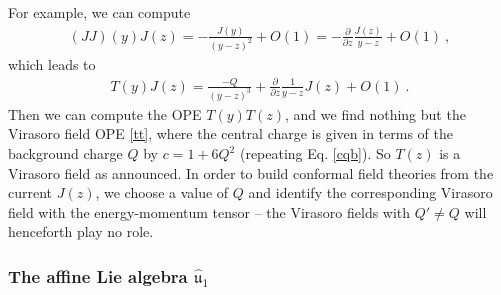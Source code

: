 \documentclass[12pt, a4paper, notitlepage, twoside]{report}
\numberwithin{equation}{section}
\theoremstyle{break}
\begin{document}
For example, we can compute 
\begin{align}
 (JJ)(y)J(z) = -\frac{J(y)}{(y-z)^2} +O(1) =  -{\frac{\partial}{\partial z}}\frac{J(z)}{y-z} + O(1)\ ,
\end{align}
which leads to 
\begin{align}
 \boxed{T(y)J(z) = \frac{-Q}{(y-z)^3} +{\frac{\partial}{\partial z}}\frac{1}{y-z}J(z) + O(1)}\ .
\label{tqj}
\end{align}
Then we can compute the OPE $T(y)T(z)$, and we find nothing but the Virasoro field OPE \eqref{tt}, where the central charge is given in terms of the background charge $Q$ by $c = 1+6 Q^2$ (repeating Eq. \eqref{cqb}). 
So $T(z)$ is a Virasoro field as announced. 
In order to build conformal field theories from the current $J(z)$, we choose a value of $Q$ and identify the corresponding Virasoro field with the energy-momentum tensor -- the Virasoro fields with $Q'\neq Q$ will henceforth play no role.

\subsubsection{The affine Lie algebra \boldmath $\hat{\mathfrak{u}}_1$}
\end{document}
